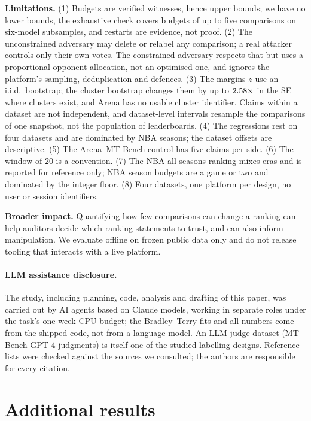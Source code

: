 \documentclass{article}
\begin{document}
\textbf{Limitations.} (1) Budgets are verified witnesses, hence upper bounds; we have no lower bounds, the exhaustive check covers budgets of up to five comparisons on six-model subsamples, and restarts are evidence, not proof. (2) The unconstrained adversary may delete or relabel any comparison; a real attacker controls only their own votes. The constrained adversary respects that but uses a proportional opponent allocation, not an optimised one, and ignores the platform's sampling, deduplication and defences. (3) The margins $z$ use an i.i.d.\ bootstrap; the cluster bootstrap changes them by up to $2.58\times$ in the SE where clusters exist, and Arena has no usable cluster identifier. Claims within a dataset are not independent, and dataset-level intervals resample the comparisons of one snapshot, not the population of leaderboards. (4) The regressions rest on four datasets and are dominated by NBA seasons; the dataset offsets are descriptive. (5) The Arena--MT-Bench control has five claims per side. (6) The window of 20 is a convention. (7) The NBA all-seasons ranking mixes eras and is reported for reference only; NBA season budgets are a game or two and dominated by the integer floor. (8) Four datasets, one platform per design, no user or session identifiers.

\textbf{Broader impact.} Quantifying how few comparisons can change a ranking can help auditors decide which ranking statements to trust, and can also inform manipulation. We evaluate offline on frozen public data only and do not release tooling that interacts with a live platform.

\paragraph{LLM assistance disclosure.} The study, including planning, code, analysis and drafting of this paper, was carried out by AI agents based on Claude models, working in separate roles under the task's one-week CPU budget; the Bradley--Terry fits and all numbers come from the shipped code, not from a language model. An LLM-judge dataset (MT-Bench GPT-4 judgments) is itself one of the studied labelling designs. Reference lists were checked against the sources we consulted; the authors are responsible for every citation.




\appendix
\section{Additional results}
\FloatBarrier
\end{document}
